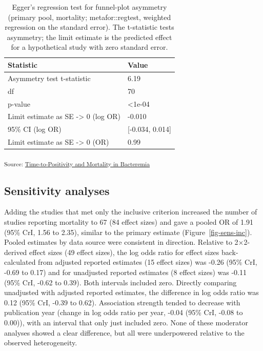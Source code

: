 \documentclass[
  11pt,
]{article}
\begin{document}
\begin{longtable}[]{@{}ll@{}}

\caption{\label{tbl-egger}Egger's regression test for funnel-plot
asymmetry (primary pool, mortality; metafor::regtest, weighted
regression on the standard error). The t-statistic tests asymmetry; the
limit estimate is the predicted effect for a hypothetical study with
zero standard error.}

\tabularnewline

\toprule\noalign{}
Statistic & Value \\
\midrule\noalign{}
\endhead
\bottomrule\noalign{}
\endlastfoot
Asymmetry test t-statistic & 6.19 \\
df & 70 \\
p-value & \textless1e-04 \\
Limit estimate as SE -\textgreater{} 0 (log OR) & -0.010 \\
95\% CI (log OR) & {[}-0.034, 0.014{]} \\
Limit estimate as SE -\textgreater{} 0 (OR) & 0.99 \\

\end{longtable}

\textsubscript{Source:
\href{https://lewis-id-lab.github.io/ttp-bacteremia-meta-analysis/notebooks/mortality-analysis-preview.html\#cell-tbl-egger}{Time-to-Positivity
and Mortality in Bacteremia}}

\subsection{Sensitivity analyses}\label{sensitivity-analyses}

Adding the studies that met only the inclusive criterion increased the
number of studies reporting mortality to 67 (84 effect sizes) and gave a
pooled OR of 1.91 (95\% CrI, 1.56 to 2.35), similar to the primary
estimate (Figure~\ref{fig-sens-inc}). Pooled estimates by data source
were consistent in direction. Relative to 2×2-derived effect sizes (49
effect sizes), the log odds ratio for effect sizes back-calculated from
adjusted reported estimates (15 effect sizes) was -0.26 (95\% CrI, -0.69
to 0.17) and for unadjusted reported estimates (8 effect sizes) was
-0.11 (95\% CrI, -0.62 to 0.39). Both intervals included zero. Directly
comparing unadjusted with adjusted reported estimates, the difference in
log odds ratio was 0.12 (95\% CrI, -0.39 to 0.62). Association strength
tended to decrease with publication year (change in log odds ratio per
year, -0.04 (95\% CrI, -0.08 to 0.00)), with an interval that only just
included zero. None of these moderator analyses showed a clear
difference, but all were underpowered relative to the observed
heterogeneity.
\end{document}
